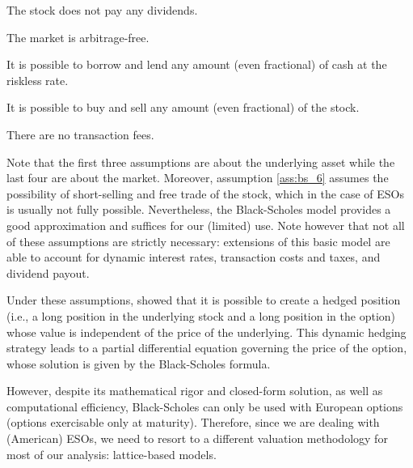     \begin{assumption}
        \label{ass:bs_3}
        The stock does not pay any dividends.
    \end{assumption}

    \begin{assumption}
        \label{ass:bs_4}
        The market is arbitrage-free.
    \end{assumption}

    \begin{assumption}
        \label{ass:bs_5}
        It is possible to borrow and lend any amount (even fractional) of cash at the riskless rate.
    \end{assumption}

    \begin{assumption}
        \label{ass:bs_6}
        It is possible to buy and sell any amount (even fractional) of the stock.
    \end{assumption}
    
    \begin{assumption}
        \label{ass:bs_7}
        There are no transaction fees.
    \end{assumption}
    
    Note that the first three assumptions are about the underlying asset while the last four are about the market. Moreover, assumption \ref*{ass:bs_6} assumes the possibility of short-selling and free trade of the stock, which in the case of ESOs is usually not fully possible. Nevertheless, the Black-Scholes model provides a good approximation and suffices for our (limited) use. Note however that not all of these assumptions are strictly necessary: extensions of this basic model are able to account for dynamic interest rates, transaction costs and taxes, and dividend payout.  

    Under these assumptions, \citet{black1973pricing} showed that it is possible to create a hedged position (i.e., a long position in the underlying stock and a long position in the option) whose value is independent of the price of the underlying. This dynamic hedging strategy leads to a partial differential equation governing the price of the option, whose solution is given by the Black-Scholes formula.

    However, despite its mathematical rigor and closed-form solution, as well as computational efficiency, Black-Scholes can only be used with European options (options exercisable only at maturity). Therefore, since we are dealing with (American) ESOs, we need to resort to a different valuation methodology for most of our analysis: lattice-based models.

